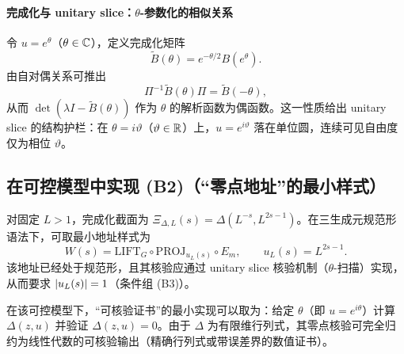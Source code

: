 \paragraph{完成化与 unitary slice：$\theta$-参数化的相似关系}
令 $u=e^\theta$（$\theta\in\mathbb{C}$），定义完成化矩阵
$$
\widetilde{B}(\theta)=e^{-\theta/2}B(e^\theta).
$$
由自对偶关系可推出
$$
\Pi^{-1}\widetilde{B}(\theta)\Pi=\widetilde{B}(-\theta),
$$
从而 $\det(\lambda I-\widetilde{B}(\theta))$ 作为 $\theta$ 的解析函数为偶函数。这一性质给出 unitary slice 的结构护栏：在 $\theta=i\vartheta$（$\vartheta\in\mathbb{R}$）上，$u=e^{i\vartheta}$ 落在单位圆，连续可见自由度仅为相位 $\vartheta$。

\subsection{在可控模型中实现 (B2)（“零点地址”的最小样式）}
对固定 $L>1$，完成化截面为 $\Xi_{\Delta,L}(s)=\Delta(L^{-s},L^{2s-1})$。在三生成元规范形语法下，可取最小地址样式为
$$
W(s)=\mathrm{LIFT}_G\circ\mathrm{PROJ}_{u_L(s)}\circ E_m,\qquad u_L(s)=L^{2s-1}.
$$
该地址已经处于规范形，且其核验应通过 unitary slice 核验机制（$\theta$-扫描）实现，从而要求 $\left\lvert u_L(s)\right\rvert=1$（条件组 (B3)）。

在该可控模型下，“可核验证书”的最小实现可以取为：给定 $\theta$（即 $u=e^{i\theta}$）计算 $\Delta(z,u)$ 并验证 $\Delta(z,u)=0$。由于 $\Delta$ 为有限维行列式，其零点核验可完全归约为线性代数的可核验输出（精确行列式或带误差界的数值证书）。

